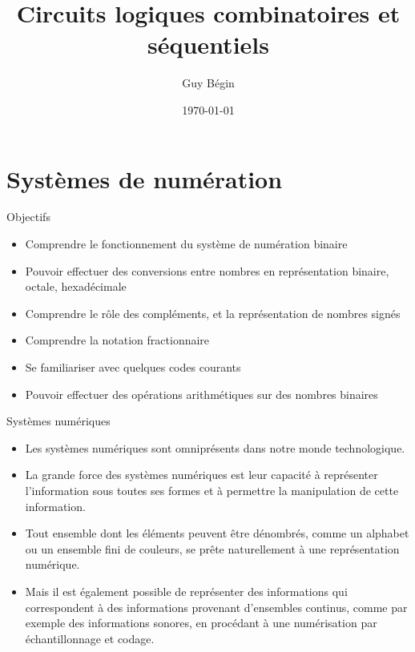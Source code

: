 \documentclass[presentation]{beamer}
\author{Guy Bégin}
\date{\today}
\title{Circuits logiques combinatoires et séquentiels}
\begin{document}
\maketitle

\section{Systèmes de numération}
\label{sec:org40742a2}


\begin{frame}[label={sec:org84e2220}]{Objectifs}
\begin{itemize}
\item Comprendre le fonctionnement du système de numération binaire
\item Pouvoir effectuer des conversions entre nombres en représentation
binaire, octale, hexadécimale
\item Comprendre le rôle des compléments, et la représentation de nombres signés
\item Comprendre la notation fractionnaire
\item Se familiariser avec quelques codes courants
\item Pouvoir effectuer des opérations arithmétiques sur des nombres binaires
\end{itemize}
\end{frame}

\begin{frame}[label={sec:org097f489}]{Systèmes numériques}
\begin{itemize}
\item Les systèmes numériques sont omniprésents dans notre monde technologique.

\item La grande force des systèmes numériques est leur capacité à représenter l'information sous toutes ses formes et à permettre la manipulation de cette information.

\item Tout ensemble dont les éléments peuvent être dénombrés, comme un alphabet ou un ensemble fini de couleurs, se prête naturellement à une représentation numérique.

\item Mais il est également possible de représenter des informations qui correspondent à des informations provenant d'ensembles continus, comme par exemple des informations sonores, en procédant à une numérisation par échantillonnage et codage.
\end{itemize}
\end{frame}
\end{document}
